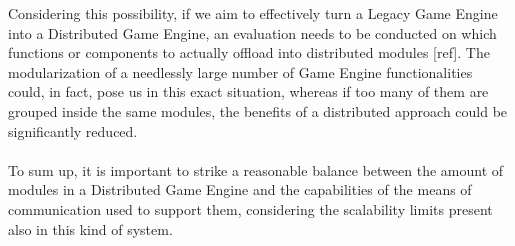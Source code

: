 Considering this possibility, if we aim to effectively turn a Legacy Game Engine into a Distributed Game Engine, an evaluation needs to be conducted on which functions or components to actually offload into distributed modules [ref]. The modularization of a needlessly large number of Game Engine functionalities could, in fact, pose us in this exact situation, whereas if too many of them are grouped inside the same modules, the benefits of a distributed approach could be significantly reduced. \\ \\
To sum up, it is important to strike a reasonable balance between the amount of modules in a Distributed Game Engine and the capabilities of the means of communication used to support them, considering the scalability limits present also in this kind of system.

